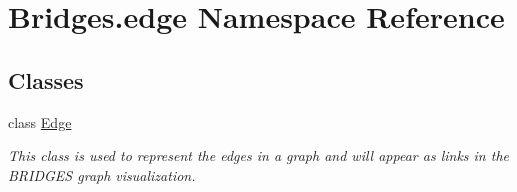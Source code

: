 \hypertarget{namespace_bridges_1_1edge}{}\section{Bridges.\+edge Namespace Reference}
\label{namespace_bridges_1_1edge}
\subsection*{Classes}
\begin{DoxyCompactItemize}
\item 
class \hyperlink{class_bridges_1_1edge_1_1_edge}{Edge}
\begin{DoxyCompactList}\small\item\em This class is used to represent the edges in a graph and will appear as links in the B\+R\+I\+D\+G\+E\+S graph visualization. \end{DoxyCompactList}\end{DoxyCompactItemize}

